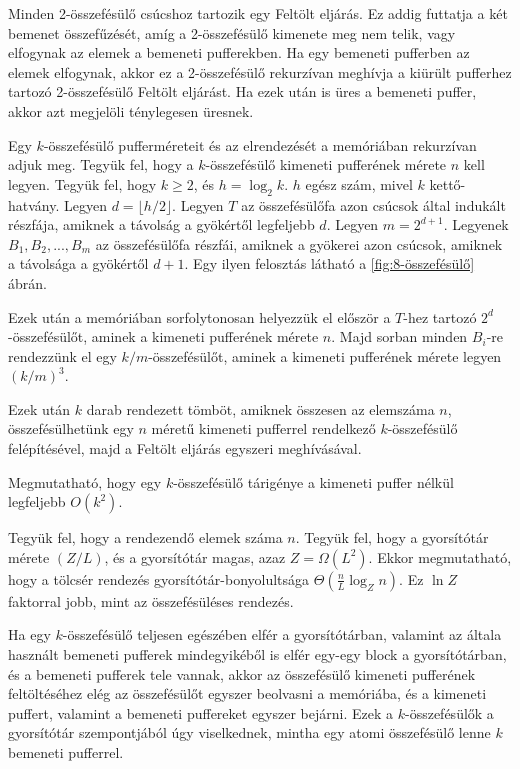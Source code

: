 \documentclass[12pt]{report}
\begin{document}
Minden 2-összefésülő csúcshoz tartozik egy Feltölt eljárás.
Ez addig futtatja a két bemenet összefűzését,
amíg a 2-összefésülő kimenete meg nem telik,
vagy elfogynak az elemek a bemeneti pufferekben.
Ha egy bemeneti pufferben az elemek elfogynak,
akkor ez a 2-összefésülő rekurzívan meghívja a kiürült pufferhez tartozó
2-összefésülő Feltölt eljárást.
Ha ezek után is üres a bemeneti puffer, akkor azt megjelöli ténylegesen üresnek.

\bigskip

Egy $k$-összefésülő pufferméreteit és az elrendezését a memóriában
rekurzívan adjuk meg.
Tegyük fel, hogy a $k$-összefésülő kimeneti pufferének mérete $n$ kell legyen.
Tegyük fel, hogy $k \ge 2$, és $h=\log_2{k}$.
$h$ egész szám, mivel $k$ kettő-hatvány.
Legyen $d = \lfloor h/2 \rfloor$.
Legyen $T$ az összefésülőfa azon csúcsok által indukált részfája,
amiknek a távolság a gyökértől legfeljebb $d$.
Legyen $m = 2^{d+1}$.
Legyenek $B_1, B_2, ..., B_m$ az összefésülőfa részfái,
amiknek a gyökerei azon csúcsok, amiknek a távolsága a gyökértől
$d+1$.
Egy ilyen felosztás látható a \ref{fig:8-összefésülő} ábrán.

Ezek után a memóriában sorfolytonosan helyezzük el először
a $T$-hez tartozó $2^d$-összefésülőt, aminek a kimeneti pufferének mérete $n$.
Majd sorban minden $B_i$-re rendezzünk el egy $k/m$-összefésülőt,
aminek a kimeneti pufferének mérete legyen $(k/m)^3$.

\bigskip

Ezek után $k$ darab rendezett tömböt, amiknek összesen az elemszáma $n$,
összefésülhetünk egy $n$ méretű kimeneti pufferrel rendelkező
$k$-összefésülő felépítésével,
majd a Feltölt eljárás egyszeri meghívásával.

\bigskip

Megmutatható\cite{brodal-distribution-sweep},
hogy egy $k$-összefésülő tárigénye a kimeneti puffer nélkül
legfeljebb $O(k^2)$.

Tegyük fel, hogy a rendezendő elemek száma $n$.
Tegyük fel, hogy a gyorsítótár mérete $(Z/L)$,
és a gyorsítótár magas, azaz $Z=\Omega(L^2)$.
Ekkor megmutatható, hogy a tölcsér rendezés gyorsítótár-bonyolultsága
$\Theta(\frac{n}{L}\log_{Z}{n})$.
Ez $\ln{Z}$ faktorral jobb, mint az összefésüléses rendezés.

Ha egy $k$-összefésülő teljesen egészében elfér a gyorsítótárban,
valamint az általa használt bemeneti pufferek mindegyikéből is elfér egy-egy
block a gyorsítótárban, és a bemeneti pufferek tele vannak,
akkor az összefésülő kimeneti pufferének feltöltéséhez
elég az összefésülőt egyszer beolvasni a memóriába,
és a kimeneti puffert, valamint a bemeneti puffereket egyszer
bejárni.
Ezek a $k$-összefésülők a gyorsítótár szempontjából úgy viselkednek,
mintha egy atomi összefésülő lenne $k$ bemeneti pufferrel.
\end{document}
